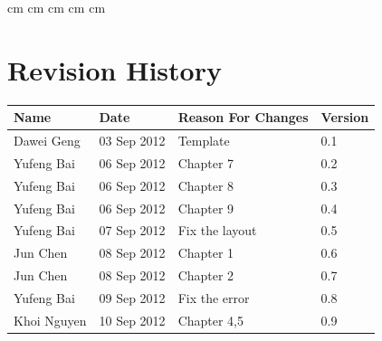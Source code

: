 \documentclass[11pt, a4paper]{report}
\begin{document}
 cm
 cm
 cm
 cm
 cm

\tableofcontents






\clearpage
\section*{Revision History}
\begin{tabular}{| l | l | l | l | }
\hline
Name      		&	Date        	&	Reason For Changes                  	  	&	Version     	\\ \hline
Dawei Geng      &	03 Sep 2012     &	Template			                  	  	&	0.1 	    	\\ \hline
Yufeng Bai         &	06 Sep 2012	&	Chapter 7						&	0.2		\\ \hline
Yufeng Bai	&	06 Sep 2012	&	Chapter 8						&	0.3		\\ \hline
Yufeng Bai	&	06 Sep 2012	&	Chapter 9						&	0.4		\\ \hline
Yufeng Bai	&	07 Sep 2012	&	Fix the layout					&	0.5		\\ \hline
Jun Chen    	&  	 08 Sep 2012 	&	Chapter 1                  	  			&	0.6     	\\ \hline
Jun Chen   	&	08 Sep 2012 	&	Chapter 2                 	  			&	0.7     	\\ \hline
Yufeng Bai	&	09 Sep 2012	&	Fix the error					&	0.8		\\ \hline	
Khoi Nguyen &	10 Sep 2012        	&	Chapter 4,5              &	0.9     	\\ \hline
%





\end{tabular}
\clearpage
\end{document}
